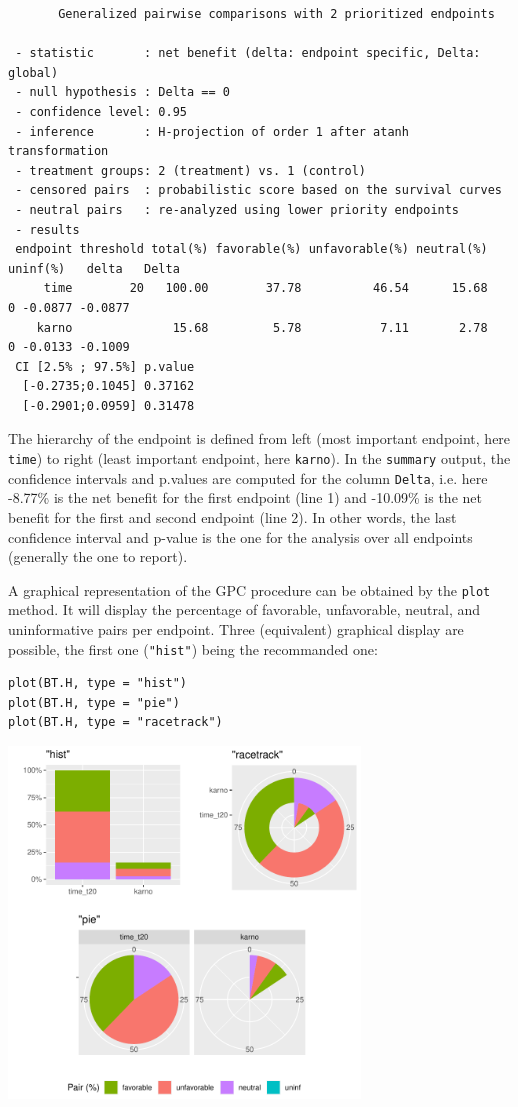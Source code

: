 \documentclass[12pt]{article}
\begin{document}
\begin{verbatim}
       Generalized pairwise comparisons with 2 prioritized endpoints

 - statistic       : net benefit (delta: endpoint specific, Delta: global) 
 - null hypothesis : Delta == 0 
 - confidence level: 0.95 
 - inference       : H-projection of order 1 after atanh transformation 
 - treatment groups: 2 (treatment) vs. 1 (control) 
 - censored pairs  : probabilistic score based on the survival curves
 - neutral pairs   : re-analyzed using lower priority endpoints
 - results
 endpoint threshold total(%) favorable(%) unfavorable(%) neutral(%) uninf(%)   delta   Delta
     time        20   100.00        37.78          46.54      15.68        0 -0.0877 -0.0877
    karno              15.68         5.78           7.11       2.78        0 -0.0133 -0.1009
 CI [2.5% ; 97.5%] p.value 
  [-0.2735;0.1045] 0.37162 
  [-0.2901;0.0959] 0.31478
\end{verbatim}

The hierarchy of the endpoint is defined from left (most important
endpoint, here \texttt{time}) to right (least important endpoint, here
\texttt{karno}). In the \texttt{summary} output, the confidence intervals and
p.values are computed for the column \texttt{Delta}, i.e. here -8.77\% is the
net benefit for the first endpoint (line 1) and -10.09\% is the net
benefit for the first and second endpoint (line 2). In other words,
the last confidence interval and p-value is the one for the analysis
over all endpoints (generally the one to report).

\bigskip

A graphical representation of the GPC procedure can be obtained by the
\texttt{plot} method. It will display the percentage of favorable,
unfavorable, neutral, and uninformative pairs per endpoint. Three
(equivalent) graphical display are possible, the first one (\texttt{"hist"})
being the recommanded one:
\lstset{language=r,label= ,caption= ,captionpos=b,numbers=none}
\begin{lstlisting}
plot(BT.H, type = "hist")
plot(BT.H, type = "pie")
plot(BT.H, type = "racetrack")
\end{lstlisting}

\begin{center}
\includegraphics[trim={0 0 0 0},width=0.7\textwidth]{./figures/plot-BuyseTest.pdf}
\end{center}
\end{document}
